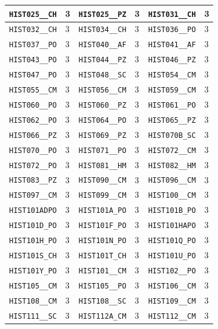 \begin{longtable}{|l|l||l|l||l|l|}
    \verb|HIST025__CH| & 3 & \verb|HIST025__PZ| & 3 & \verb|HIST031__CH| & 3\\\hline
    \verb|HIST032__CH| & 3 & \verb|HIST034__CH| & 3 & \verb|HIST036__PO| & 3\\\hline
    \verb|HIST037__PO| & 3 & \verb|HIST040__AF| & 3 & \verb|HIST041__AF| & 3\\\hline
    \verb|HIST043__PO| & 3 & \verb|HIST044__PZ| & 3 & \verb|HIST046__PZ| & 3\\\hline
    \verb|HIST047__PO| & 3 & \verb|HIST048__SC| & 3 & \verb|HIST054__CM| & 3\\\hline
    \verb|HIST055__CM| & 3 & \verb|HIST056__CM| & 3 & \verb|HIST059__CM| & 3\\\hline
    \verb|HIST060__PO| & 3 & \verb|HIST060__PZ| & 3 & \verb|HIST061__PO| & 3\\\hline
    \verb|HIST062__PO| & 3 & \verb|HIST064__PO| & 3 & \verb|HIST065__PZ| & 3\\\hline
    \verb|HIST066__PZ| & 3 & \verb|HIST069__PZ| & 3 & \verb|HIST070B_SC| & 3\\\hline
    \verb|HIST070__PO| & 3 & \verb|HIST071__PO| & 3 & \verb|HIST072__CM| & 3\\\hline
    \verb|HIST072__PO| & 3 & \verb|HIST081__HM| & 3 & \verb|HIST082__HM| & 3\\\hline
    \verb|HIST083__PZ| & 3 & \verb|HIST090__CM| & 3 & \verb|HIST096__CM| & 3\\\hline
    \verb|HIST097__CM| & 3 & \verb|HIST099__CM| & 3 & \verb|HIST100__CM| & 3\\\hline
    \verb|HIST101ADPO| & 3 & \verb|HIST101A_PO| & 3 & \verb|HIST101B_PO| & 3\\\hline
    \verb|HIST101D_PO| & 3 & \verb|HIST101F_PO| & 3 & \verb|HIST101HAPO| & 3\\\hline
    \verb|HIST101H_PO| & 3 & \verb|HIST101N_PO| & 3 & \verb|HIST101Q_PO| & 3\\\hline
    \verb|HIST101S_CH| & 3 & \verb|HIST101T_CH| & 3 & \verb|HIST101U_PO| & 3\\\hline
    \verb|HIST101Y_PO| & 3 & \verb|HIST101__CM| & 3 & \verb|HIST102__PO| & 3\\\hline
    \verb|HIST105__CM| & 3 & \verb|HIST105__PO| & 3 & \verb|HIST106__CM| & 3\\\hline
    \verb|HIST108__CM| & 3 & \verb|HIST108__SC| & 3 & \verb|HIST109__CM| & 3\\\hline
    \verb|HIST111__SC| & 3 & \verb|HIST112A_CM| & 3 & \verb|HIST112__CM| & 3\\\hline

\end{longtable}
